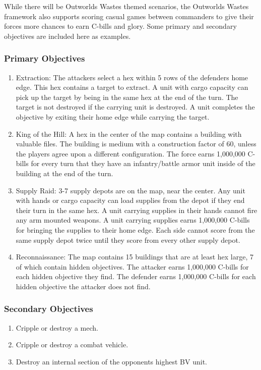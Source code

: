 \documentclass[UTF8]{article}
\begin{document}
While there will be Outworlds Wastes themed scenarios, the Outworlds Wastes framework also supports scoring casual games between commanders to give their forces more chances to earn C-bills and glory.
Some primary and secondary objectives are included here as examples.\\

\subsubsection{Primary Objectives}

\begin{enumerate}

\item Extraction: The attackers select a hex within 5 rows of the defenders home edge.
This hex contains a target to extract.
A unit with cargo capacity can pick up the target by being in the same hex at the end of the turn.
The target is not destroyed if the carrying unit is destroyed.
A unit completes the objective by exiting their home edge while carrying the target.

\item King of the Hill: A hex in the center of the map contains a building with valuable files.
The building is medium with a construction factor of 60, unless the players agree upon a different configuration.
The force earns 1,000,000 C-bills for every turn that they have an infantry/battle armor unit inside of the building at the end of the turn.

\item Supply Raid: 3-7 supply depots are on the map, near the center.
Any unit with hands or cargo capacity can load supplies from the depot if they end their turn in the same hex.
A unit carrying supplies in their hands cannot fire any arm mounted weapons.
A unit carrying supplies earns 1,000,000 C-bills for bringing the supplies to their home edge.
Each side cannot score from the same supply depot twice until they score from every other supply depot.

\item Reconnaissance: The map contains 15 buildings that are at least hex large, 7 of which contain hidden objectives.
The attacker earns 1,000,000 C-bills for each hidden objective they find. 
The defender earns 1,000,000 C-bills for each hidden objective the attacker does not find.

\end{enumerate}

\subsubsection{Secondary Objectives}

\begin{enumerate}

\item Cripple or destroy a mech.

\item Cripple or destroy a combat vehicle.

\item Destroy an internal section of the opponents highest BV unit.



\end{enumerate}
\end{document}
